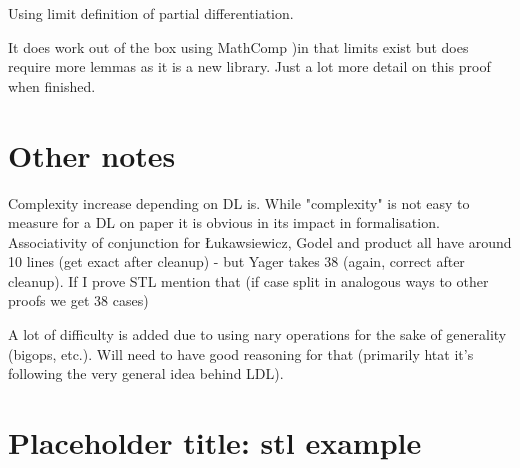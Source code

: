 \documentclass[a4paper,UKenglish,cleveref, autoref, thm-restate]{lipics-v2021}
\begin{document}
Using limit definition of partial differentiation.

It does work out of the box using MathComp )in that limits exist but does require more lemmas as it is a new library.
Just a lot more detail on this proof when finished.


\section{Other notes}

Complexity increase depending on DL is. While "complexity" is not easy to measure for a DL on paper it is obvious in its impact in formalisation. Associativity of conjunction for Łukawsiewicz, Godel and product all have around 10 lines (get exact after cleanup) - but Yager takes 38 (again, correct after cleanup). If I prove STL mention that (if case split in analogous ways to other proofs we get 38 cases)

A lot of difficulty is added due to using nary operations for the sake of generality (bigops, etc.). Will need to have good reasoning for that (primarily htat it's following the very general idea behind LDL).

\section{Placeholder title: stl example}






\appendix
\end{document}
